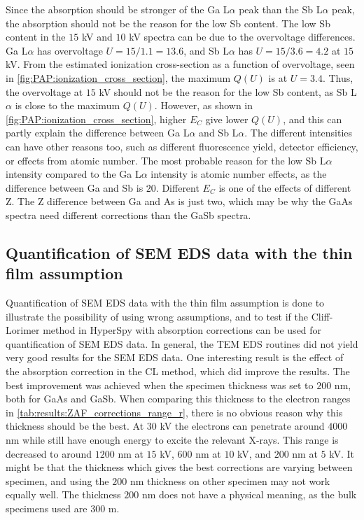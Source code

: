 Since the absorption should be stronger of the Ga L$\alpha$ peak than the Sb L$\alpha$ peak, the absorption should not be the reason for the low Sb content.
The low Sb content in the $15$ kV and $10$ kV spectra can be due to the overvoltage differences.
Ga L$\alpha$ has overvoltage $U = 15/1.1 = 13.6$, and Sb L$\alpha$ has $U = 15/3.6 = 4.2$ at $15$ kV.
From the estimated ionization cross-section as a function of overvoltage, seen in \cref{fig:PAP:ionization_cross_section}, the maximum $Q(U)$ is at $U = 3.4$.
Thus, the overvoltage at $15$ kV should not be the reason for the low Sb content, as Sb L$\alpha$ is close to the maximum $Q(U)$.
However, as shown in \cref{fig:PAP:ionization_cross_section}, higher $E_C$ give lower $Q(U)$, and this can partly explain the difference between Ga L$\alpha$ and Sb L$\alpha$.
The different intensities can have other reasons too, such as different fluorescence yield, detector efficiency, or effects from atomic number.
The most probable reason for the low Sb L$\alpha$ intensity compared to the Ga L$\alpha$ intensity is atomic number effects, as the difference between Ga and Sb is $20$.
Different $E_C$ is one of the effects of different Z.
The Z difference between Ga and As is just two, which may be why the GaAs spectra need different corrections than the GaSb spectra.






\subsection{Quantification of SEM EDS data with the thin film assumption}
\label{discussion:quantitative:thin_film_assumption}

Quantification of SEM EDS data with the thin film assumption is done to illustrate the possibility of using wrong assumptions, and to test if the Cliff-Lorimer method in HyperSpy with absorption corrections can be used for quantification of SEM EDS data.
In general, the TEM EDS routines did not yield very good results for the SEM EDS data.
One interesting result is the effect of the absorption correction in the CL method, which did improve the results.
The best improvement was achieved when the specimen thickness was set to $200$ nm, both for GaAs and GaSb.
When comparing this thickness to the electron ranges in \cref{tab:results:ZAF_corrections_range_r}, there is no obvious reason why this thickness should be the best.
At $30$ kV the electrons can penetrate around $4000$ nm while still have enough energy to excite the relevant X-rays.
This range is decreased to around $1200$ nm at $15$ kV, $600$ nm at $10$ kV, and $200$ nm at $5$ kV.
It might be that the thickness which gives the best corrections are varying between specimen, and using the $200$ nm thickness on other specimen may not work equally well.
The thickness $200$ nm does not have a physical meaning, as the bulk specimens used are $300$ \textmu m.

